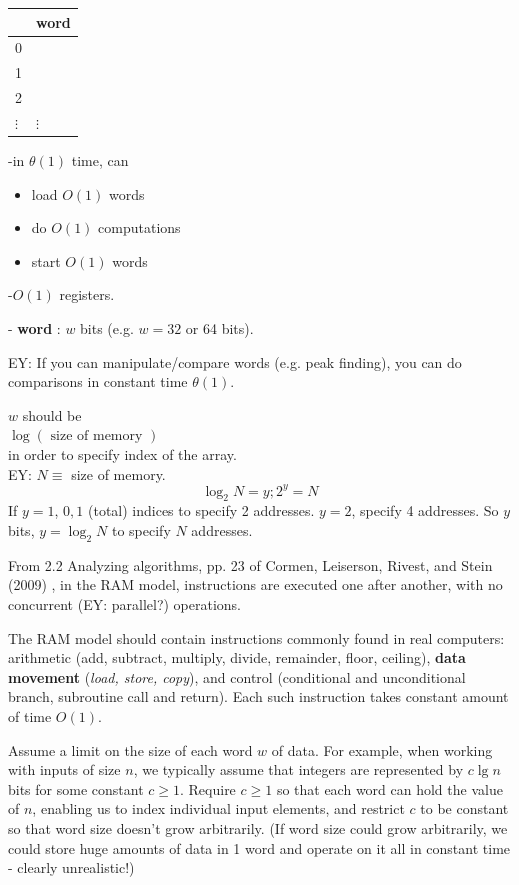 \documentclass[10pt]{amsart}
\begin{document}
\begin{table}
	\begin{tabular}{ l|l}
		& word \\ \hline
		0	&   \\ \hline
		1	&   \\ \hline
		2	&   \\ \hline
		$\vdots$	&  $\vdots$ \\  \hline
	\end{tabular}
\end{table}



-in $\theta(1)$ time, can \\
\begin{itemize}
	\item load $O(1)$ words 
	\item do $O(1)$ computations
	\item start $O(1)$ words
\end{itemize}
-$O(1)$ registers.

- \textbf{word} : $w$ bits (e.g. $w = 32$ or 64 bits).

EY: If you can manipulate/compare words (e.g. peak finding), you can do comparisons in constant time $\theta(1)$. 

$w$ should be \\
$\log{(\text{ size of memory })}$ \\
in order to specify index of the array. \\

EY: $N \equiv$ size of memory. 
\[
\log_2{N} = y; 2^y = N
\]
If $y=1$, $0,1$ (total) indices to specify 2 addresses. $y=2$, specify 4 addresses. So $y$ bits, $y=\log_2{N}$ to specify $N$ addresses.

From 2.2 Analyzing algorithms, pp. 23 of Cormen, Leiserson, Rivest, and Stein (2009) \cite{CLRS2009}, in the RAM model, instructions are executed one after another, with no concurrent (EY: parallel?) operations.

The RAM model should contain instructions commonly found in real computers: arithmetic (add, subtract, multiply, divide, remainder, floor, ceiling), \textbf{data movement} (\emph{load, store, copy}), and control (conditional and unconditional branch, subroutine call and return). Each such instruction takes constant amount of time $O(1)$.

Assume a limit on the size of each word $w$ of data. For example, when working with inputs of size $n$, we typically assume that integers are represented by $c\lg{n}$ bits for some constant $c\geq 1$. Require $c\geq 1$ so that each word can hold the value of $n$, enabling us to index individual input elements, and restrict $c$ to be constant so that word size doesn't grow arbitrarily. (If word size could grow arbitrarily, we could store huge amounts of data in 1 word and operate on it all in constant time - clearly unrealistic!)
\end{document}
